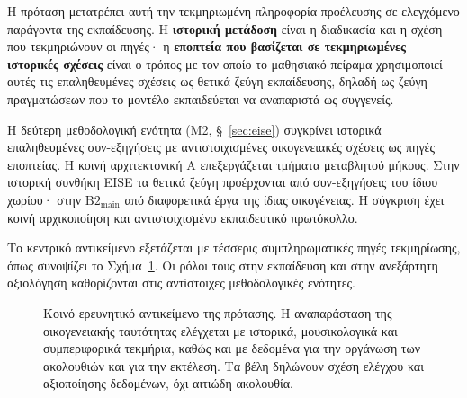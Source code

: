 \documentclass[11pt,a4paper]{article}
\begin{document}
Η πρόταση μετατρέπει αυτή την τεκμηριωμένη πληροφορία προέλευσης σε ελεγχόμενο παράγοντα της εκπαίδευσης. Η \textbf{ιστορική μετάδοση} είναι η διαδικασία και η σχέση που τεκμηριώνουν οι πηγές· η \textbf{εποπτεία που βασίζεται σε τεκμηριωμένες ιστορικές σχέσεις} είναι ο τρόπος με τον οποίο το μαθησιακό πείραμα χρησιμοποιεί αυτές τις επαληθευμένες σχέσεις ως θετικά ζεύγη εκπαίδευσης, δηλαδή ως ζεύγη πραγματώσεων που το μοντέλο εκπαιδεύεται να αναπαριστά ως συγγενείς.

Η δεύτερη μεθοδολογική ενότητα (M2, §~\ref{sec:eise}) συγκρίνει ιστορικά επαληθευμένες συν-εξηγήσεις με αντιστοιχισμένες οικογενειακές σχέσεις ως πηγές εποπτείας. Η κοινή αρχιτεκτονική A επεξεργάζεται τμήματα μεταβλητού μήκους. Στην ιστορική συνθήκη EISE τα θετικά ζεύγη προέρχονται από συν-εξηγήσεις του ίδιου χωρίου· στην $\mathrm{B2}_{\mathrm{main}}$ από διαφορετικά έργα της ίδιας οικογένειας. Η σύγκριση έχει κοινή αρχικοποίηση και αντιστοιχισμένο εκπαιδευτικό πρωτόκολλο.

Το κεντρικό αντικείμενο εξετάζεται με τέσσερις συμπληρωματικές πηγές τεκμηρίωσης, όπως συνοψίζει το Σχήμα~\ref{fig:conceptual-v865}. Οι ρόλοι τους στην εκπαίδευση και στην ανεξάρτητη αξιολόγηση καθορίζονται στις αντίστοιχες μεθοδολογικές ενότητες.

\begin{figure}[htbp]
\centering
{}
\caption{Κοινό ερευνητικό αντικείμενο της πρότασης. Η αναπαράσταση της οικογενειακής ταυτότητας ελέγχεται με ιστορικά, μουσικολογικά και συμπεριφορικά τεκμήρια, καθώς και με δεδομένα για την οργάνωση των ακολουθιών και για την εκτέλεση. Τα βέλη δηλώνουν σχέση ελέγχου και αξιοποίησης δεδομένων, όχι αιτιώδη ακολουθία.}
\label{fig:conceptual-v865}
\end{figure}
\FloatBarrier
\end{document}
